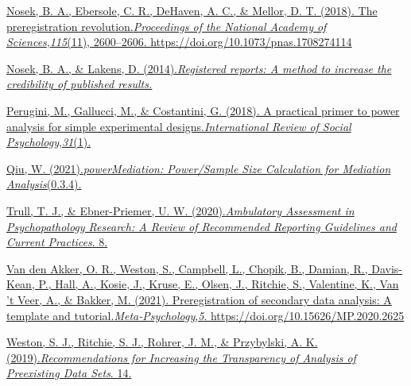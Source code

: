 \documentclass[
]{article}
\begin{document}
\href{https://www.zotero.org/google-docs/?EJLlNC}{Nosek, B. A.,
Ebersole, C. R., DeHaven, A. C., \& Mellor, D. T. (2018). The
preregistration
revolution.}\href{https://www.zotero.org/google-docs/?EJLlNC}{\emph{Proceedings
of the National Academy of
Sciences}}\href{https://www.zotero.org/google-docs/?EJLlNC}{,}\href{https://www.zotero.org/google-docs/?EJLlNC}{\emph{115}}\href{https://www.zotero.org/google-docs/?EJLlNC}{(11),
2600--2606. https://doi.org/10.1073/pnas.1708274114}

\href{https://www.zotero.org/google-docs/?EJLlNC}{Nosek, B. A., \&
Lakens, D.
(2014).}\href{https://www.zotero.org/google-docs/?EJLlNC}{\emph{Registered
reports: A method to increase the credibility of published results.}}

\href{https://www.zotero.org/google-docs/?EJLlNC}{Perugini, M.,
Gallucci, M., \& Costantini, G. (2018). A practical primer to power
analysis for simple experimental
designs.}\href{https://www.zotero.org/google-docs/?EJLlNC}{\emph{International
Review of Social
Psychology}}\href{https://www.zotero.org/google-docs/?EJLlNC}{,}\href{https://www.zotero.org/google-docs/?EJLlNC}{\emph{31}}\href{https://www.zotero.org/google-docs/?EJLlNC}{(1).}

\href{https://www.zotero.org/google-docs/?EJLlNC}{Qiu, W.
(2021).}\href{https://www.zotero.org/google-docs/?EJLlNC}{\emph{powerMediation:
Power/Sample Size Calculation for Mediation
Analysis}}\href{https://www.zotero.org/google-docs/?EJLlNC}{(0.3.4).}

\href{https://www.zotero.org/google-docs/?EJLlNC}{Trull, T. J., \&
Ebner-Priemer, U. W.
(2020).}\href{https://www.zotero.org/google-docs/?EJLlNC}{\emph{Ambulatory
Assessment in Psychopathology Research: A Review of Recommended
Reporting Guidelines and Current
Practices}}\href{https://www.zotero.org/google-docs/?EJLlNC}{. 8.}

\href{https://www.zotero.org/google-docs/?EJLlNC}{Van den Akker, O. R.,
Weston, S., Campbell, L., Chopik, B., Damian, R., Davis-Kean, P., Hall,
A., Kosie, J., Kruse, E., Olsen, J., Ritchie, S., Valentine, K., Van 't
Veer, A., \& Bakker, M. (2021). Preregistration of secondary data
analysis: A template and
tutorial.}\href{https://www.zotero.org/google-docs/?EJLlNC}{\emph{Meta-Psychology}}\href{https://www.zotero.org/google-docs/?EJLlNC}{,}\href{https://www.zotero.org/google-docs/?EJLlNC}{\emph{5}}\href{https://www.zotero.org/google-docs/?EJLlNC}{.
https://doi.org/10.15626/MP.2020.2625}

\href{https://www.zotero.org/google-docs/?EJLlNC}{Weston, S. J.,
Ritchie, S. J., Rohrer, J. M., \& Przybylski, A. K.
(2019).}\href{https://www.zotero.org/google-docs/?EJLlNC}{\emph{Recommendations
for Increasing the Transparency of Analysis of Preexisting Data
Sets}}\href{https://www.zotero.org/google-docs/?EJLlNC}{. 14.}
\end{document}
